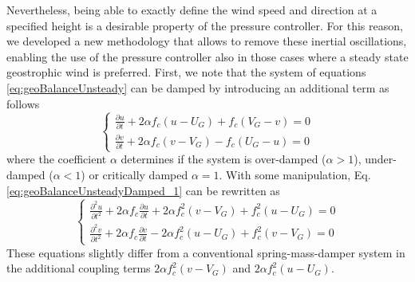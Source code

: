\documentclass[journal abbreviation, manuscript]{copernicus}
\begin{document}
Nevertheless, being able to exactly define the wind speed and direction at a specified height is a desirable property of the pressure controller. For this reason, we developed a new methodology that allows to remove these inertial oscillations, enabling the use of the pressure controller also in those cases where a steady state geostrophic wind is preferred. First, we note that the system of equations \ref{eq:geoBalanceUnsteady} can be damped by introducing an additional term as follows
\begin{equation}
	\begin{cases}
		\frac{\partial u}{\partial t} + 2\alpha f_c(u-U_G) + f_c(V_G - v) = 0  \\
		\frac{\partial v}{\partial t} + 2\alpha f_c(v-V_G) - f_c(U_G -u) = 0
	\end{cases} 
	\label{eq:geoBalanceUnsteadyDamped_1}
\end{equation}
where the coefficient $\alpha$ determines if the system is over-damped ($\alpha > 1$), under-damped ($\alpha < 1$) or critically damped $\alpha = 1$. With some manipulation, Eq. \ref{eq:geoBalanceUnsteadyDamped_1} can be rewritten as
\begin{equation}
	\begin{cases}
		\frac{\partial^2 u}{\partial t^2} + 2\alpha f_c \frac{\partial u}{\partial t} + 2\alpha f_c^2(v-V_G) + f_c^2(u-U_G) = 0  \\
		\frac{\partial^2 v}{\partial t^2} + 2\alpha f_c \frac{\partial v}{\partial t} - 2\alpha f_c^2(u-U_G) + f_c^2(v-V_G) = 0
	\end{cases} 
	\label{eq:geoBalanceUnsteadyDamped_2}
\end{equation}
These equations slightly differ from a conventional spring-mass-damper system in the additional coupling terms $2\alpha f_c^2(v-V_G)$ and $2\alpha f_c^2(u-U_G)$.
\end{document}
